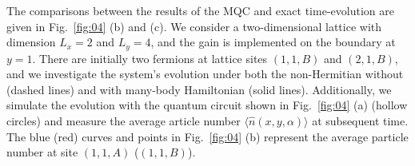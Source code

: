 \documentclass[longbibliography, aps, prx, amsmath, amssymb, amsfonts, twocolumn,superscriptaddress, footinbib]{revtex4-1}
\begin{document}
	The comparisons between the results of the MQC and exact time-evolution are given in Fig.~\ref{fig:04} (b) and (c). 
	We consider a two-dimensional lattice with dimension $L_x=2$ and $L_y=4$, and the gain is implemented on the boundary at $y=1$. %
	There are initially two fermions at lattice sites $(1,1,B)$ and $(2,1,B)$, %
    and we investigate the system's evolution under both the non-Hermitian without (dashed lines) and with many-body Hamiltonian (solid lines). Additionally, we simulate the evolution with the quantum circuit shown in Fig.~\ref{fig:04} (a) (hollow circles) and measure the average article number $\langle \hat{n}(x,y,\alpha)\rangle$ at subsequent time. The blue (red) curves and points in Fig.~\ref{fig:04} (b) represent the average particle number at site $(1,1,A)$ ($(1,1,B)$).
	{}
	
\end{document}
